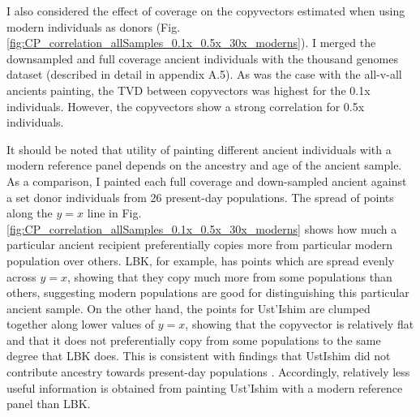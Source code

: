 I also considered the effect of coverage on the copyvectors estimated when using modern individuals as donors (Fig. \ref{fig:CP_correlation_allSamples_0.1x_0.5x_30x_moderns}). I merged the downsampled and full coverage ancient individuals with the thousand genomes dataset (described in detail in appendix A.5). As was the case with the all-v-all ancients painting, the TVD between copyvectors was highest for the 0.1x individuals. However, the copyvectors show a strong correlation for 0.5x individuals. 

It should be noted that utility of painting different ancient individuals with a modern reference panel depends on the ancestry and age of the ancient sample. As a comparison, I painted each full coverage and down-sampled ancient against a set donor individuals from 26 present-day populations. The spread of points along the $y=x$ line in Fig. \ref{fig:CP_correlation_allSamples_0.1x_0.5x_30x_moderns} shows how much a particular ancient recipient preferentially copies more from particular modern population over others. LBK, for example, has points which are spread evenly across $y=x$, showing that they copy much more from some populations than others, suggesting modern populations are good for distinguishing this particular ancient sample. On the other hand, the points for Ust'Ishim are clumped together along lower values of $y=x$, showing that the copyvector is relatively flat and that it does not preferentially copy from some populations to the same degree that LBK does. This is consistent with findings that UstIshim did not contribute ancestry towards present-day populations \cite{Fu2014}. Accordingly, relatively less useful information is obtained from painting Ust'Ishim with a modern reference panel than LBK.

